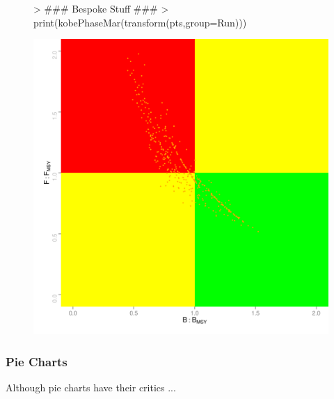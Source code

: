 \documentclass[shortnames,nojss,article]{jss}
\begin{document}
\begin{figure}\begin{center}
\begin{Schunk}
\begin{Sinput}
> ### Bespoke Stuff ###
> print(kobePhaseMar(transform(pts,group=Run)))          
\end{Sinput}
\end{Schunk}
\includegraphics{kobe-023}
\end{center}\end{figure}

\clearpage

\subsubsection{Pie Charts}

Although pie charts have their critics ...
\end{document}
